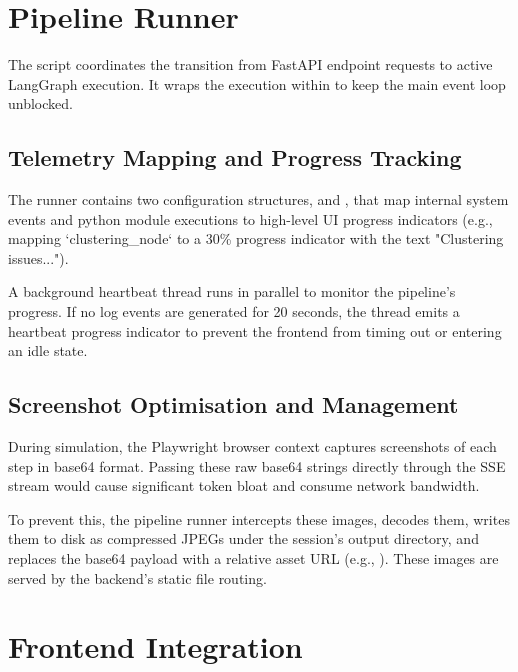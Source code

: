 \section{Pipeline Runner}
\label{sec:pipeline-runner}

The  script coordinates the transition from FastAPI endpoint requests to active LangGraph execution. It wraps the execution within  to keep the main event loop unblocked.

\subsection{Telemetry Mapping and Progress Tracking}
\label{sec:telemetry-mapping}

The runner contains two configuration structures,  and , that map internal system events and python module executions to high-level UI progress indicators (e.g., mapping `clustering_node` to a 30\% progress indicator with the text "Clustering issues..."). 

A background heartbeat thread runs in parallel to monitor the pipeline's progress. If no log events are generated for 20 seconds, the thread emits a heartbeat progress indicator to prevent the frontend from timing out or entering an idle state.

\subsection{Screenshot Optimisation and Management}
\label{sec:screenshot-optimisation}

During simulation, the Playwright browser context captures screenshots of each step in base64 format. Passing these raw base64 strings directly through the SSE stream would cause significant token bloat and consume network bandwidth. 

To prevent this, the pipeline runner intercepts these images, decodes them, writes them to disk as compressed JPEGs under the session's output directory, and replaces the base64 payload with a relative asset URL (e.g., ). These images are served by the backend's static file routing.


\section{Frontend Integration}
\label{sec:frontend}

